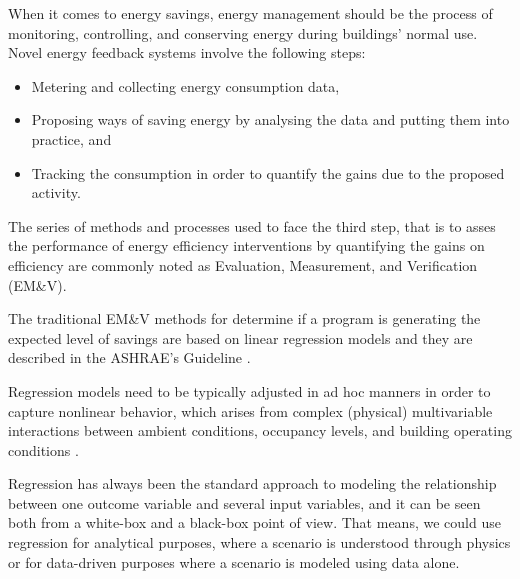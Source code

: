\documentclass[10pt, conference, compsocconf]{IEEEtran}
\begin{document}
When it comes to energy savings, energy management should be the process of monitoring, controlling, and conserving energy during buildings' normal use.  Novel energy feedback systems involve the following steps:

\begin{itemize}
\item Metering and collecting energy consumption data,
\item Proposing ways of saving energy by analysing the data and putting them into practice, and
\item Tracking the consumption in order to quantify the gains due to the proposed activity.
\end{itemize}


The series of methods and processes used to face the third step, that is to asses the performance of energy efficiency interventions by quantifying the gains on efficiency are commonly noted as Evaluation, Measurement, and Verification (EM\&V). 



The traditional EM\&V methods for determine if a program is generating the expected level of savings are based on linear regression models and they are described in the ASHRAE’s Guideline \cite{ashrae2002ashrae}. 

Regression models need to be typically adjusted in ad hoc manners in order to capture nonlinear behavior, which arises from complex (physical) multivariable interactions between ambient conditions, occupancy levels, and building operating conditions \cite{heo2012gaussian}.


Regression has always been the standard approach to modeling the relationship between one outcome variable  and several input variables, and it can be seen both from a white-box and a black-box point of view. That means, we could use regression for analytical purposes, where a scenario is understood through physics or for data-driven purposes where a scenario is modeled using data alone. 
\end{document}
